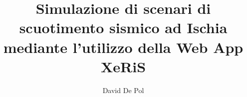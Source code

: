 \documentclass[a4paper,12pt,titlepage]{article}
\begin{document}
\author{David De Pol}
\title{Simulazione di scenari di scuotimento
sismico ad Ischia mediante l'utilizzo
della Web App XeRiS}
\maketitle
\tableofcontents
\end{document}
